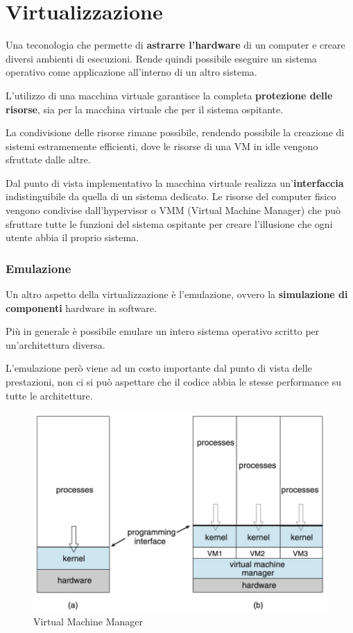 \section{Virtualizzazione}
Una teconologia che permette di \textbf{astrarre l'hardware} di un computer e creare diversi ambienti di esecuzioni. Rende quindi possibile eseguire un sistema operativo come applicazione all'interno di un altro sistema.

\spacer
L'utilizzo di una macchina virtuale garantisce la completa \textbf{protezione delle risorse}, sia per la macchina virtuale che per il sistema ospitante.

La condivisione delle risorse rimane possibile, rendendo possibile la creazione di sistemi estramemente efficienti, dove le risorse di una VM in idle vengono sfruttate dalle altre.

\spacer
Dal punto di vista implementativo la macchina virtuale realizza un'\textbf{interfaccia} indistinguibile da quella di un sistema dedicato.
Le risorse del computer fisico vengono condivise dall'hypervisor o VMM (Virtual Machine Manager) che può sfruttare tutte le funzioni del sistema ospitante per creare l'illusione che ogni utente abbia il proprio sistema.


\subsubsection*{Emulazione}
Un altro aspetto della virtualizzazione è l'emulazione, ovvero la \textbf{simulazione di componenti} hardware in software.

Più in generale è possibile emulare un intero sistema operativo scritto per un'architettura diversa.

L'emulazione però viene ad un costo importante dal punto di vista delle prestazioni, non ci si può aspettare che il codice abbia le stesse performance su tutte le architetture.

\begin{figure}[H]
    \centering
    \includegraphics[width=0.4\linewidth]{assets/VMM.jpg}
    \caption{Virtual Machine Manager}
\end{figure}

